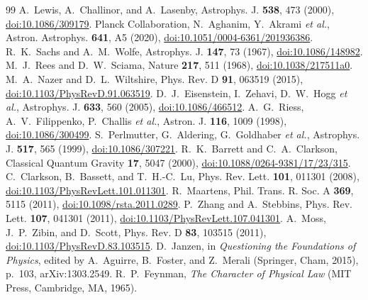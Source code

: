 \documentclass[aps,prd,reprint,amsmath,amssymb,superscriptaddress]{revtex4-2}
\begin{document}
\begin{thebibliography}{99}
 A.~Lewis, A.~Challinor, and A.~Lasenby, Astrophys. J. \textbf{538}, 473 (2000), \href{https://doi.org/10.1086/309179}{doi:10.1086/309179}.
 Planck Collaboration, N.~Aghanim, Y.~Akrami \textit{et al.}, Astron. Astrophys. \textbf{641}, A5 (2020), \href{https://doi.org/10.1051/0004-6361/201936386}{doi:10.1051/0004-6361/201936386}.
 R.~K.~Sachs and A.~M.~Wolfe, Astrophys. J. \textbf{147}, 73 (1967), \href{https://doi.org/10.1086/148982}{doi:10.1086/148982}.
 M.~J.~Rees and D.~W.~Sciama, Nature \textbf{217}, 511 (1968), \href{https://doi.org/10.1038/217511a0}{doi:10.1038/217511a0}.
 M.~A.~Nazer and D.~L.~Wiltshire, Phys. Rev. D \textbf{91}, 063519 (2015), \href{https://doi.org/10.1103/PhysRevD.91.063519}{doi:10.1103/PhysRevD.91.063519}.
 D.~J.~Eisenstein, I.~Zehavi, D.~W.~Hogg \textit{et al.}, Astrophys. J. \textbf{633}, 560 (2005), \href{https://doi.org/10.1086/466512}{doi:10.1086/466512}.
 A.~G.~Riess, A.~V.~Filippenko, P.~Challis \textit{et al.}, Astron. J. \textbf{116}, 1009 (1998), \href{https://doi.org/10.1086/300499}{doi:10.1086/300499}.
 S.~Perlmutter, G.~Aldering, G.~Goldhaber \textit{et al.}, Astrophys. J. \textbf{517}, 565 (1999), \href{https://doi.org/10.1086/307221}{doi:10.1086/307221}.
 R.~K.~Barrett and C.~A.~Clarkson, Classical Quantum Gravity \textbf{17}, 5047 (2000), \href{https://doi.org/10.1088/0264-9381/17/23/315}{doi:10.1088/0264-9381/17/23/315}.
 C.~Clarkson, B.~Bassett, and T.~H.-C.~Lu, Phys. Rev. Lett. \textbf{101}, 011301 (2008), \href{https://doi.org/10.1103/PhysRevLett.101.011301}{doi:10.1103/PhysRevLett.101.011301}.
 R.~Maartens, Phil. Trans. R. Soc. A \textbf{369}, 5115 (2011), \href{https://doi.org/10.1098/rsta.2011.0289}{doi:10.1098/rsta.2011.0289}.
 P.~Zhang and A.~Stebbins, Phys. Rev. Lett. \textbf{107}, 041301 (2011), \href{https://doi.org/10.1103/PhysRevLett.107.041301}{doi:10.1103/PhysRevLett.107.041301}.
 A.~Moss, J.~P.~Zibin, and D.~Scott, Phys. Rev. D \textbf{83}, 103515 (2011), \href{https://doi.org/10.1103/PhysRevD.83.103515}{doi:10.1103/PhysRevD.83.103515}.
 D.~Janzen, in \textit{Questioning the Foundations of Physics}, edited by A.~Aguirre, B.~Foster, and Z.~Merali (Springer, Cham, 2015), p.~103, arXiv:1303.2549.
 R.~P.~Feynman, \textit{The Character of Physical Law} (MIT Press, Cambridge, MA, 1965).

\end{thebibliography}
\end{document}
